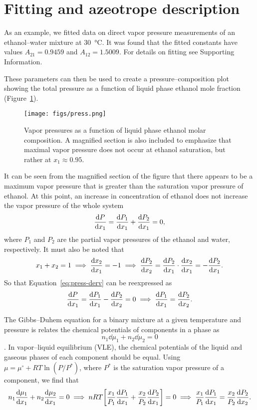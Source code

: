 \section{Fitting and azeotrope description}

As an example, we fitted data on direct vapor pressure measurements of
an ethanol--water mixture at \SI{30}{\celsius}. It was found that the
fitted constants have values $A_{21}=0.9459$ and $A_{12}=1.5009$.
For details on fitting see Supporting Information.

These parameters can then be used to create a pressure--composition plot
showing the total pressure as a function of liquid phase ethanol mole 
fraction (Figure~\ref{fig:press-plot}).

\begin{figure}[ht]
    \centering
    \texttt{[image: figs/press.png]}
    \caption{Vapor pressures as a function of liquid phase ethanol molar composition.
    A magnified section is also included to emphasize that maximal vapor pressure
    does not occur at ethanol saturation, but rather at $x_1\approx 0.95$.}
    \label{fig:press-plot}
\end{figure}

It can be seen from the magnified section of the figure that there appears to
be a maximum vapor pressure that is greater than the saturation vapor pressure
of ethanol. At this point, an increase in concentration of ethanol does not
increase the vapor pressure of the whole system
\begin{equation}\label{eq:press-derv}
    \dv{P}{x_1} = \dv{P_1}{x_1} + \dv{P_2}{x_1} = 0,
\end{equation}
where $P_1$ and $P_2$ are the partial vapor pressures of the ethanol and
water, respectively. It must also be noted that 
\[
    x_1 + x_2 = 1 \implies \dv{x_2}{x_1} = -1 
    \implies \dv{P_2}{x_2} = \dv{P_2}{x_1} \cdot \dv{x_2}{x_1} =
    -\dv{P_2}{x_1}.
\]
So that Equation~\ref{eq:press-derv} can be reexpressed as
\begin{equation}\label{eq:press-derv2}
    \dv{P}{x_1} = \dv{P_1}{x_1} - \dv{P_2}{x_2} = 0 \implies
    \dv{P_1}{x_1} = \dv{P_2}{x_2}.
\end{equation}

The Gibbs--Duhem equation for a binary mixture at a given temperature and
pressure is relates the chemical potentials of components in a phase as
\begin{equation}\label{eq:gibbs-duhem}
    n_1\dd{\mu_1} + n_2 \dd{\mu_2} = 0
\end{equation}
\cite[p.~439]{enggbook}.
In vapor--liquid equilibrium (VLE), the chemical potentials of the liquid
and gaseous phases of each component should be equal. Using $\mu = \mu^\circ
+ RT \ln(P/P^*)$, where $P^*$ is the saturation vapor pressure of a
component, we find that
\begin{equation}\label{eq:gibbs-duhem2}
    n_1 \dv{\mu_1}{x_1} + n_2 \dv{\mu_2}{x_1} = 0 \implies
    nRT \qty[ \dfrac{x_1}{P_1} \dv{P_1}{x_1} + \dfrac{x_2}{P_2} \dv{P_2}{x_1} ] = 0
    \implies \dfrac{x_1}{P_1} \dv{P_1}{x_1} = \dfrac{x_2}{P_2} \dv{P_2}{x_2}.
\end{equation}

